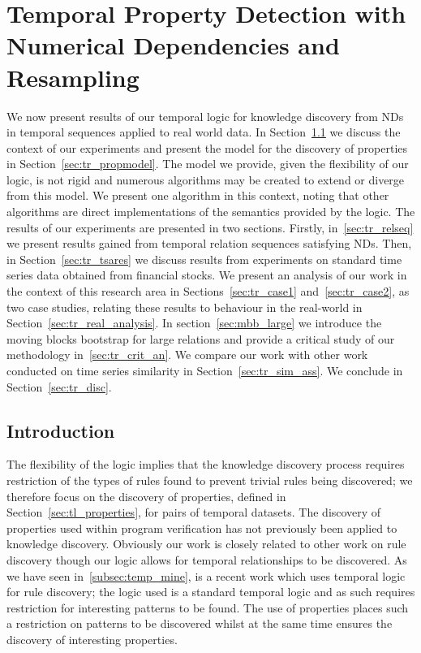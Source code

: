 \chapter{Temporal Property Detection with Numerical Dependencies and
Resampling}\label{chap:tempresult}

We now present results of our temporal logic for knowledge discovery
from NDs in temporal sequences applied to
real world data. In Section~\ref{sec:tr_intro} we discuss  the context
of our experiments and present the model for the discovery of
properties in Section~\ref{sec:tr_propmodel}. The model we provide,
given the flexibility of our logic, is not rigid and numerous
algorithms may be created to extend or diverge from this model. 
We present one algorithm in this context, noting that other algorithms
are direct implementations of the semantics provided by the logic. 
The results of our
experiments are presented in two sections. Firstly,
in~\ref{sec:tr_relseq} we present results gained from temporal
relation sequences satisfying NDs. Then, in
Section~\ref{sec:tr_tsares} we discuss results from experiments on
standard time series data obtained from financial stocks. We present
an analysis of our work in the context of this research area in
Sections~\ref{sec:tr_case1} and~\ref{sec:tr_case2}, as two case
studies, relating these 
results to behaviour in 
the real-world in Section~\ref{sec:tr_real_analysis}. In
section~\ref{sec:mbb_large} we introduce the moving blocks bootstrap
for large relations and provide a
critical study of our methodology in~\ref{sec:tr_crit_an}. We compare
our work with other work conducted on time series similarity in
Section~\ref{sec:tr_sim_ass}. We conclude in Section~\ref{sec:tr_disc}.

\section{Introduction}\label{sec:tr_intro}

The flexibility of the
logic implies that the knowledge discovery process requires
restriction of the types of rules found to prevent trivial rules being
discovered; we therefore focus on the discovery of properties, defined
in Section~\ref{sec:tl_properties}, 
for pairs of temporal datasets. The discovery of properties used
within program verification has not previously been applied to
knowledge discovery. Obviously our 
work is closely related to other work on rule discovery though our
logic allows for temporal relationships to be discovered. As we have
seen in~\ref{subsec:temp_mine}, \cite{bt98} is
a recent work which uses temporal logic for rule discovery; the logic
used is a standard temporal logic and as such requires restriction for
interesting patterns to be found. The use of properties places such a
restriction on patterns to be discovered whilst at the same time
ensures the discovery of interesting properties.

